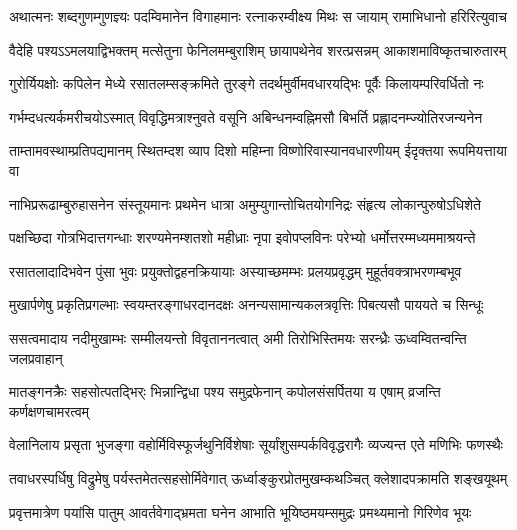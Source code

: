 
\fourlineindentedshloka
{अथात्मनः शब्दगुणम्गुणज्ञ्यः}
{पदम्विमानेन विगाहमानः}
{रत्नाकरम्वीक्ष्य मिथः स जायाम्}
{रामाभिधानो हरिरित्युवाच} %

\fourlineindentedshloka
{वैदेहि पश्यऽऽमलयाद्विभक्तम्}
{मत्सेतुना फेनिलमम्बुराशिम्}
{छायापथेनेव शरत्प्रसन्नम्}
{आकाशमाविष्कृतचारुतारम्} %

\fourlineindentedshloka
{गुरोर्यियक्षोः कपिलेन मेध्ये}
{रसातलम्सङ्क्रमिते तुरङ्गे}
{तदर्थमुर्वीमवधारयद्भिः}
{पूर्वैः किलायम्परिवर्धितो नः} %

\fourlineindentedshloka
{गर्भम्दधत्यर्कमरीचयोऽस्मात्}
{विवृद्धिमत्राश्नुवते वसूनि}
{अबिन्धनम्वह्निमसौ बिभर्ति}
{प्रह्लादनम्ज्योतिरजन्यनेन} %

\fourlineindentedshloka
{ताम्तामवस्थाम्प्रतिपद्यमानम्}
{स्थितम्दश व्याप दिशो महिम्ना}
{विष्णोरिवास्यानवधारणीयम्}
{ईदृक्तया रूपमियत्ताया वा} %

\fourlineindentedshloka
{नाभिप्ररूढाम्बुरुहासनेन}
{संस्तूयमानः प्रथमेन धात्रा}
{अमुम्युगान्तोचितयोगनिद्रः}
{संहृत्य लोकान्पुरुषोऽधिशेते} %

\fourlineindentedshloka
{पक्षच्छिदा गोत्रभिदात्तगन्धाः}
{शरण्यमेनम्शतशो महीध्राः}
{नृपा इवोपप्लविनः परेभ्यो}
{धर्मोत्तरम्मध्यममाश्रयन्ते} %

\fourlineindentedshloka
{रसातलादादिभवेन पुंसा}
{भुवः प्रयुक्तोद्वहनक्रियायाः}
{अस्याच्छमम्भः प्रलयप्रवृद्धम्}
{मुहूर्तवक्त्राभरणम्बभूव} %

\fourlineindentedshloka
{मुखार्पणेषु प्रकृतिप्रगल्भाः}
{स्वयम्तरङ्गाधरदानदक्षः}
{अनन्यसामान्यकलत्रवृत्तिः}
{पिबत्यसौ पाययते च सिन्धूः} %

\fourlineindentedshloka
{ससत्वमादाय नदीमुखाम्भः}
{सम्मीलयन्तो विवृताननत्वात्}
{अमी तिरोभिस्तिमयः सरन्ध्रैः}
{ऊध्वम्वितन्वन्ति जलप्रवाहान्} %

\fourlineindentedshloka
{मातङ्गनक्रैः सहसोत्पतद्भिर्ः}
{भिन्नान्द्विधा पश्य समुद्रफेनान्}
{कपोलसंसर्पितया य एषाम्}
{व्रजन्ति कर्णक्षणचामरत्वम्} %

\fourlineindentedshloka
{वेलानिलाय प्रसृता भुजङ्गा}
{वहोर्मिविस्फूर्जथुनिर्विशेषाः}
{सूर्यांशुसम्पर्कविवृद्धरागैः}
{व्यज्यन्त एते मणिभिः फणस्थैः} %

\fourlineindentedshloka
{तवाधरस्पर्धिषु विद्रुमेषु}
{पर्यस्तमेतत्सहसोर्मिवेगात्}
{ऊर्ध्वाङ्कुरप्रोतमुखम्कथञ्चित्}
{क्लेशादपक्रामति शङ्खयूथम्} %

\fourlineindentedshloka
{प्रवृत्तमात्रेण पयांसि पातुम्}
{आवर्तवेगाद्भ्रमता घनेन}
{आभाति भूयिष्ठमयम्समुद्रः}
{प्रमथ्यमानो गिरिणेव भूयः} %

